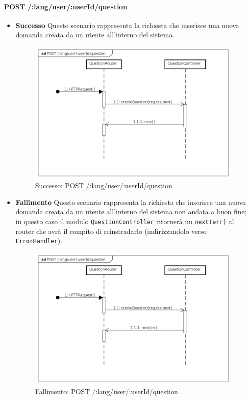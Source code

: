 \paragraph{POST /:lang/user/:userId/question}
\begin{itemize}
\item \textbf{Successo}
Questo scenario rappresenta la richiesta che inserisce una nuova domanda creata da un utente all'interno del sistema.


\begin{figure}[ht]
	\centering
	\includegraphics[scale=0.45]{UML/DiagrammiDiSequenza/Back-end/POST__lang_user__userId_question_success.png}
	\caption{Successo: POST /:lang/user/:userId/question}
\end{figure}
\FloatBarrier

\item \textbf{Fallimento}
Questo scenario rappresenta la richiesta che inserisce una nuova domanda creata da un utente all'interno del sistema non andata a buon fine; in questo caso il modulo \texttt{QuestionController} ritornerà un \texttt{next(err)} al router che avrà il compito di reinstradarlo (indirizzandolo verso \texttt{ErrorHandler}).

\begin{figure}[ht]
	\centering
	\includegraphics[scale=0.45]{UML/DiagrammiDiSequenza/Back-end/POST__lang_user__userId_question_failure.png}
	\caption{Fallimento: POST /:lang/user/:userId/question}
\end{figure}
\FloatBarrier

\end{itemize}
